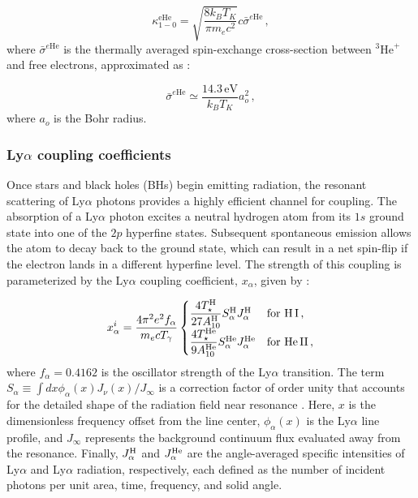 \documentclass[apj,twocolumn, appendixfloats, twocolappendix, numberedappendix, tighten]{openjournal}
\begin{document}
\begin{appendix}
\begin{equation}
    \kappa^{\mathrm{eHe}}_{1-0} = \sqrt{\frac{8k_B T_K}{\pi m_e c^2}}c \bar{\sigma}^{e\mathrm{He}}\,,
\end{equation}
where $\bar{\sigma}^{e\mathrm{He}}$ is the thermally averaged spin-exchange cross-section between $^3\mathrm{He}^+$ and free electrons, approximated as \citep{McQuinn2009}:

\begin{equation}
    \bar{\sigma}^{e\mathrm{He}}  \simeq \frac{14.3 \mathrm{ \,eV}}{k_B T_K} a^2_o\,,
\end{equation}
where $a_o$ is the Bohr radius.


\subsubsection{\texorpdfstring{Ly$\alpha$}{Lyman-alpha} coupling coefficients}

Once stars and black holes (BHs) begin emitting radiation, the resonant scattering of Ly$\alpha$ photons provides a highly efficient channel for coupling. The absorption of a Ly$\alpha$ photon excites a neutral hydrogen atom from its $1s$ ground state into one of the $2p$ hyperfine states. Subsequent spontaneous emission allows the atom to decay back to the ground state, which can result in a net spin-flip if the electron lands in a different hyperfine level. The strength of this coupling is parameterized by the Ly$\alpha$ coupling coefficient, $x_\alpha$, given by \citep[][]{Madau1997, Barkana2005}:


\begin{equation}
x^i_\alpha =
\frac{4\pi^2 e^2 f_\alpha}{m_e c T_\gamma}
\begin{cases}
\dfrac{4 T^\mathrm{H}_{\star}}{27 A^\mathrm{H}_{10}}
S_\alpha^\mathrm{H} J^\mathrm{H}_{\alpha}
& \text{for H\,I}\,, \\

\dfrac{4 T^\mathrm{He}_{\star}}{9 A^\mathrm{He}_{10}}
S_\alpha^\mathrm{He} J^\mathrm{He}_{\alpha}
& \text{for } \mathrm{He\,II}\,,
\end{cases}
\end{equation}
where $f_\alpha = 0.4162$ is the oscillator strength of the Ly$\alpha$ transition. The term $S_\alpha \equiv \int dx \phi_\alpha(x)J_\nu(x)/J_\infty$ is a correction factor of order unity that accounts for the detailed shape of the radiation field near resonance \citep{Chen2004}. Here, $x$ is the dimensionless frequency offset from the line center, $\phi_\alpha(x)$ is the Ly$\alpha$ line profile, and $J_\infty$ represents the background continuum flux evaluated away from the resonance. Finally, $J^{\rm H}_\alpha$ and $J^{\rm He}_\alpha$ are the angle-averaged specific intensities of  Ly$\alpha$ and  Ly$\alpha$ radiation, respectively, each defined as the number of incident photons per unit area, time, frequency, and solid angle.



\end{appendix}
\end{document}
